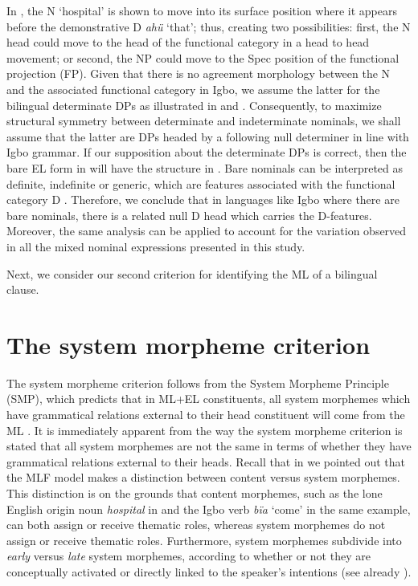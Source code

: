 \documentclass[output=paper]{langsci/langscibook}
\begin{document}
In , the N ‘hospital’ is shown to move into its surface position where it appears before the demonstrative D \textit{ahü} ‘that’; thus, creating two possibilities: first, the N head could move to the head of the functional category in a head to head movement; or second, the NP could move to the Spec position of the functional projection (FP). Given that there is no agreement morphology between the N and the associated functional category in Igbo, we assume the latter for the bilingual determinate DPs as illustrated in  and . Consequently, to maximize structural symmetry between determinate and indeterminate nominals, we shall assume that the latter are DPs headed by a following null determiner in line with Igbo grammar. If our supposition about the determinate DPs is correct, then the bare EL form in  will have the structure in . Bare nominals can be interpreted as definite, indefinite or generic, which are features associated with the functional category D \citep{Radford2004}. Therefore, we conclude that in languages like Igbo where there are bare nominals, there is a related null D head which carries the D-features. Moreover, the same analysis can be applied to account for the variation observed in all the mixed nominal expressions presented in this study. 

Next, we consider our second criterion for identifying the ML of a bilingual clause.

\section{The system morpheme criterion}

The system morpheme criterion follows from the System Morpheme Principle (SMP), which predicts that in ML+EL constituents, all system morphemes which have grammatical relations external to their head constituent will come from the ML \citep[59]{MyersScotton2002}. It is immediately apparent from the way the system morpheme criterion is stated that all system morphemes are not the same in terms of whether they have grammatical relations external to their heads. Recall that in  we pointed out that the MLF model makes a distinction between content versus system morphemes. This distinction is on the grounds that content morphemes, such as the lone English origin noun \textit{hospital} in  and the Igbo verb \textit{bïa} ‘come’ in the same example, can both assign or receive thematic roles, whereas system morphemes do not assign or receive thematic roles. Furthermore, system morphemes subdivide into \textit{early} versus \textit{late} system morphemes, according to whether or not they are conceptually activated or directly linked to the speaker’s intentions (see already ). 
\end{document}

